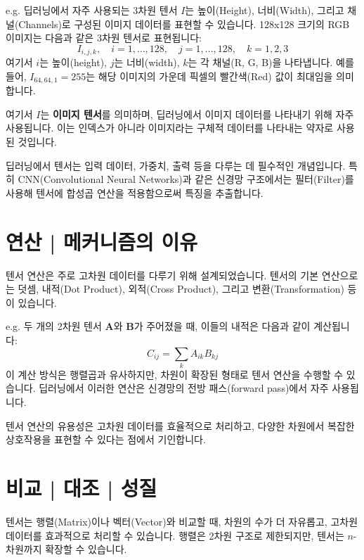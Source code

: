 \documentclass[12pt]{article}
\begin{document}
\vspace{1\baselineskip}
\noindent {} e.g. 딥러닝에서 자주 사용되는 3차원 텐서 \( I \)는 높이(Height), 너비(Width), 그리고 채널(Channels)로 구성된 이미지 데이터를 표현할 수 있습니다. 128x128 크기의 RGB 이미지는 다음과 같은 3차원 텐서로 표현됩니다:
\[
  I_{i,j,k}, \quad i = 1, \dots, 128, \quad j = 1, \dots, 128, \quad k = 1, 2, 3
\]
여기서 \( i \)는 높이(height), \( j \)는 너비(width), \( k \)는 각 채널(R, G, B)을 나타냅니다. 예를 들어, \( I_{64, 64, 1} = 255 \)는 해당 이미지의 가운데 픽셀의 빨간색(Red) 값이 최대임을 의미합니다.

\noindent 여기서 \( I \)는 \textbf{이미지 텐서}를 의미하며, 딥러닝에서 이미지 데이터를 나타내기 위해 자주 사용됩니다. 이는 인덱스가 아니라 이미지라는 구체적 데이터를 나타내는 약자로 사용된 것입니다.

\noindent 딥러닝에서 텐서는 입력 데이터, 가중치, 출력 등을 다루는 데 필수적인 개념입니다. 특히 CNN(Convolutional Neural Networks)과 같은 신경망 구조에서는 필터(Filter)를 사용해 텐서에 합성곱 연산을 적용함으로써 특징을 추출합니다.

\section{연산 | 메커니즘의 이유}

\noindent 텐서 연산은 주로 고차원 데이터를 다루기 위해 설계되었습니다. 텐서의 기본 연산으로는 덧셈, 내적(Dot Product), 외적(Cross Product), 그리고 변환(Transformation) 등이 있습니다.

\vspace{1\baselineskip}
\noindent {} e.g. 두 개의 2차원 텐서 \( \mathbf{A} \)와 \( \mathbf{B} \)가 주어졌을 때, 이들의 내적은 다음과 같이 계산됩니다:
\[
  C_{ij} = \sum_k A_{ik} B_{kj}
\]
이 계산 방식은 행렬곱과 유사하지만, 차원이 확장된 형태로 텐서 연산을 수행할 수 있습니다. 딥러닝에서 이러한 연산은 신경망의 전방 패스(forward pass)에서 자주 사용됩니다.

\noindent 텐서 연산의 유용성은 고차원 데이터를 효율적으로 처리하고, 다양한 차원에서 복잡한 상호작용을 표현할 수 있다는 점에서 기인합니다.

\section{비교 | 대조 | 성질}

\noindent 텐서는 행렬(Matrix)이나 벡터(Vector)와 비교할 때, 차원의 수가 더 자유롭고, 고차원 데이터를 효과적으로 처리할 수 있습니다. 행렬은 2차원 구조로 제한되지만, 텐서는 \( n \)-차원까지 확장할 수 있습니다.
\end{document}

